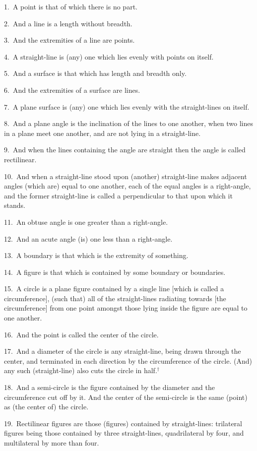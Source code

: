 \begin{Parallel}{}{}
{1.~A point is that of which there is no part.

2.~And a line is a length without breadth.

3.~And the extremities of a line are points.

4.~A straight-line is (any) one which lies  evenly with points on itself.

5.~And a surface is that which has length and breadth only.

6.~And the extremities of a surface are lines.

7.~A plane surface is (any) one which lies evenly with the straight-lines on itself.

8.~And a plane angle is the inclination of the lines to one another, when two lines in a plane 
meet one another, and are not lying in a straight-line.

9.~And when the lines containing the angle are straight then the angle is called rectilinear.

10.~And when a straight-line stood upon (another) straight-line makes adjacent angles (which are) equal to one another, each of the equal angles is a
right-angle, and the former straight-line  is called a perpendicular to that upon which it stands.

11.~An obtuse angle is one greater than a right-angle.

12.~And an acute angle (is) one less than a right-angle.

13.~A boundary is that which is the extremity of something.

14.~A figure is that which is contained by some boundary or boundaries.

15.~A circle is a plane figure  contained by a single line [which is called a circumference], (such that) all of the straight-lines  radiating towards
 [the circumference] from one
point amongst those lying inside the figure  are equal to one another.

16.~And the point is called the center of the circle.

17.~And a diameter of the circle is any straight-line, being drawn through the
center, and terminated in each direction by the circumference of the circle. (And) any such (straight-line) also cuts the circle in half.$^\dag$

18.~And a semi-circle is the figure contained by the diameter  and
the circumference  cut off by it. And the center of the semi-circle is the same (point)
as (the center of) the circle.

19.~Rectilinear figures are those (figures) contained by straight-lines: trilateral
figures being those contained by three straight-lines,  quadrilateral   by four,
and multilateral by more than four.

}
\end{Parallel}

